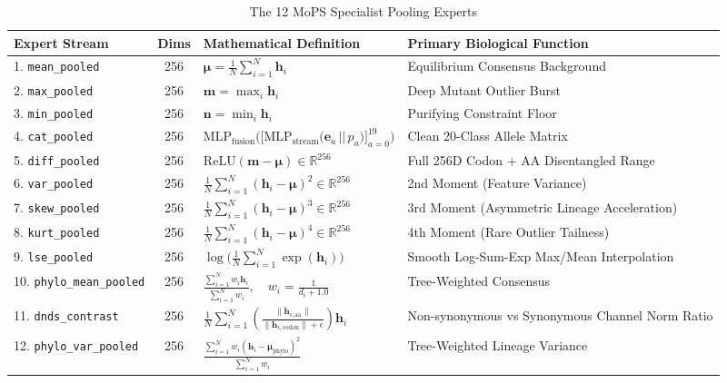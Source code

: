 \documentclass[11pt,a4paper]{article}
\begin{document}
\begin{table}[h]
\centering
\caption{The 12 MoPS Specialist Pooling Experts}
\vspace{0.5em}
\begin{tabular}{l c l p{5.5cm}}
\toprule
\textbf{Expert Stream} & \textbf{Dims} & \textbf{Mathematical Definition} & \textbf{Primary Biological Function} \\
\midrule
1. \texttt{mean\_pooled} & 256 & $\boldsymbol{\mu} = \frac{1}{N} \sum_{i=1}^N \mathbf{h}_i$ & Equilibrium Consensus Background \\
2. \texttt{max\_pooled} & 256 & $\mathbf{m} = \max_{i} \mathbf{h}_i$ & Deep Mutant Outlier Burst \\
3. \texttt{min\_pooled} & 256 & $\mathbf{n} = \min_{i} \mathbf{h}_i$ & Purifying Constraint Floor \\
4. \texttt{cat\_pooled} & 256 & $\text{MLP}_{\text{fusion}}\Big( \Big[ \text{MLP}_{\text{stream}}\Big( \mathbf{e}_a \,||\, p_a \Big) \Big]_{a=0}^{19} \Big)$ & Clean 20-Class Allele Matrix \\
5. \texttt{diff\_pooled} & 256 & $\text{ReLU}(\mathbf{m} - \boldsymbol{\mu}) \in \mathbb{R}^{256}$ & Full 256D Codon + AA Disentangled Range \\
6. \texttt{var\_pooled} & 256 & $\frac{1}{N} \sum_{i=1}^N (\mathbf{h}_i - \boldsymbol{\mu})^2 \in \mathbb{R}^{256}$ & 2nd Moment (Feature Variance) \\
7. \texttt{skew\_pooled} & 256 & $\frac{1}{N} \sum_{i=1}^N (\mathbf{h}_i - \boldsymbol{\mu})^3 \in \mathbb{R}^{256}$ & 3rd Moment (Asymmetric Lineage Acceleration) \\
8. \texttt{kurt\_pooled} & 256 & $\frac{1}{N} \sum_{i=1}^N (\mathbf{h}_i - \boldsymbol{\mu})^4 \in \mathbb{R}^{256}$ & 4th Moment (Rare Outlier Tailness) \\
9. \texttt{lse\_pooled} & 256 & $\log \big( \frac{1}{N} \sum_{i=1}^N \exp(\mathbf{h}_i) \big)$ & Smooth Log-Sum-Exp Max/Mean Interpolation \\
10. \texttt{phylo\_mean\_pooled} & 256 & $\frac{\sum_{i=1}^N w_i \mathbf{h}_i}{\sum_{i=1}^N w_i}, \quad w_i = \frac{1}{d_i + 1.0}$ & Tree-Weighted Consensus \\
11. \texttt{dnds\_contrast} & 256 & $\frac{1}{N} \sum_{i=1}^N \left( \frac{\|\mathbf{h}_{i, \text{aa}}\|}{\|\mathbf{h}_{i, \text{codon}}\| + \epsilon} \right) \mathbf{h}_i$ & Non-synonymous vs Synonymous Channel Norm Ratio \\
12. \texttt{phylo\_var\_pooled} & 256 & $\frac{\sum_{i=1}^N w_i (\mathbf{h}_i - \boldsymbol{\mu}_{\text{phylo}})^2}{\sum_{i=1}^N w_i}$ & Tree-Weighted Lineage Variance \\
\bottomrule
\end{tabular}
\end{table}
\end{document}
